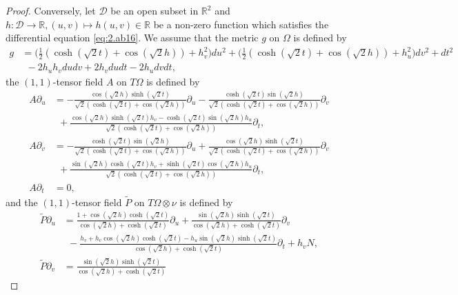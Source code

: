 \documentclass[reqno]{amsart}%
\theoremstyle{definition}
\numberwithin{equation}{section}
\begin{document}
\begin{proof}
Conversely, let $\mathcal{D}$ be an open subset in $\mathbb{R}^2$ and  $h:\mathcal{D}\to\mathbb{R}, (u,v)\mapsto h(u,v)\in\mathbb{R}$
be a non-zero function which satisfies the differential equation \eqref{eq:2.ab16}.
We assume that the metric $g$ on $\Omega$ is defined by
%
\begin{equation}\label{eq:2.ab17}
\begin{aligned}
g&=\Big(\tfrac{1}{2}(\cosh(\sqrt{2}t)+\cos(\sqrt{2}h))+h_v^2\Big)du^2
+\Big(\tfrac{1}{2}(\cosh(\sqrt{2}t)+\cos(\sqrt{2}h))+h_u^2\Big)dv^2+dt^2\\
&\ \ -2h_uh_vdudv+2h_vdudt-2h_udvdt,
\end{aligned}
\end{equation}
the $(1,1)$-tensor field $A$ on $T\Omega$ is defined by
\begin{equation}\label{eqn:A}
\begin{aligned}
A\partial_u&=-\tfrac{\cos(\sqrt{2}h)\sinh(\sqrt{2}t)}{\sqrt{2}(\cosh(\sqrt{2}t)+\cos(\sqrt{2}h))}
\partial_u
-\tfrac{\cosh(\sqrt{2}t)\sin(\sqrt{2}h)}{\sqrt{2}(\cosh(\sqrt{2}t)+\cos(\sqrt{2}h))}\partial_v\\
&\ \ +\tfrac{\cos(\sqrt{2}h)\sinh(\sqrt{2}t)h_v-\cosh(\sqrt{2}t)\sin(\sqrt{2}h)h_u}
{\sqrt{2}(\cosh(\sqrt{2}t)+\cos(\sqrt{2}h))}\partial_t,\\
A\partial_v&=-\tfrac{\cosh(\sqrt{2}t)\sin(\sqrt{2}h)}{\sqrt{2}(\cosh(\sqrt{2}t)+\cos(\sqrt{2}h))}
\partial_u
+\tfrac{\cos(\sqrt{2}h)\sinh(\sqrt{2}t)}{\sqrt{2}(\cosh(\sqrt{2}t)+\cos(\sqrt{2}h))}\partial_v\\
&\ \ +\tfrac{\sin(\sqrt{2}h)\cosh(\sqrt{2}t)h_v+\sinh(\sqrt{2}t)\cos(\sqrt{2}h)h_u}
{\sqrt{2}(\cosh(\sqrt{2}t)+\cos(\sqrt{2}h))}\partial_t,\\
A\partial_t&=0,
\end{aligned}
\end{equation}
and the $(1,1)$-tensor field $\tilde{P}$ on $T\Omega\otimes \nu$ is defined by 
\begin{equation}\label{defP}
\begin{aligned}
	\tilde{P}\partial_u&=\tfrac{1+\cos(\sqrt{2}h)\cosh(\sqrt{2}t)}{\cos(\sqrt{2}h)+\cosh(\sqrt{2}t)}
	\partial_u
	+\tfrac{\sin(\sqrt{2}h)\sinh(\sqrt{2}t)}{\cos(\sqrt{2}h)+\cosh(\sqrt{2}t)}\partial_v\\
	&\ \ -
\tfrac{h_v+h_v\cos(\sqrt{2}h)\cosh(\sqrt{2}t)-h_u\sin(\sqrt{2}h)\sinh(\sqrt{2}t)}
{{\cos(\sqrt{2}h)+\cosh(\sqrt{2}t)}}\partial_t+h_vN,\\
	\tilde{P}\partial_v&=\tfrac{\sin(\sqrt{2}h)\sinh(\sqrt{2}t)}{\cos(\sqrt{2}h)+\cosh(\sqrt{2}t)}

\end{aligned}
\end{equation}
\end{proof}
\end{document}
